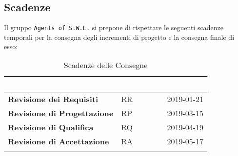\newpage

\subsection{Scadenze}
Il gruppo \texttt{Agents of S.W.E.} si prepone di rispettare le seguenti scadenze temporali per la consegna degli incrementi di progetto e la consegna finale di esso:


\begin{longtable}{|C{.40\textwidth}|C{.15\textwidth}|C{.20\textwidth}|}
\hline
{}\textbf{\textcolor{white}{Consegna}} & \textbf{\textcolor{white}{Acronimo}} & \textbf{\textcolor{white}{Data}}\\
\hline \hline
\endfirsthead

\textbf{Revisione dei Requisiti} & RR & 2019-01-21 \\
\hline
{}\textbf{Revisione di Progettazione} & RP & 2019-03-15 \\
\hline
\textbf{Revisione di Qualifica} & RQ & 2019-04-19 \\
\hline
{}\textbf{Revisione di Accettazione} & RA & 2019-05-17 \\
\hline
\caption{Scadenze delle Consegne \label{table:Scadenze}}
\end{longtable}